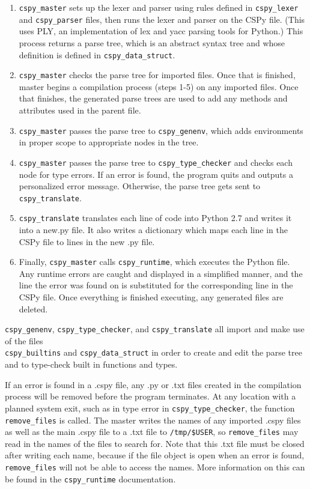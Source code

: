 \documentclass{article}
\begin{document}
\begin{enumerate}
\item \verb|cspy_master| sets up the lexer and parser using rules defined in \verb|cspy_lexer| and \verb|cspy_parser| files, then runs the lexer and parser on the CSPy file. (This uses PLY, an implementation of lex and yacc parsing tools for Python.) This process returns a parse tree, which is an abstract syntax tree and whose definition is defined in \verb|cspy_data_struct|.

\item \verb|cspy_master| checks the parse tree for imported files. Once that is finished, master begins a compilation process (steps 1-5) on any imported files. Once that finishes, the generated parse trees are used to add any methods and attributes used in the parent file.

\item \verb|cspy_master| passes the parse tree to \verb|cspy_genenv|, which adds environments in proper scope to appropriate nodes in the tree.

\item \verb|cspy_master| passes the parse tree to \verb|cspy_type_checker| and checks each node for type errors. If an error is found, the program quits and outputs a personalized error message. Otherwise, the parse tree gets sent to \verb|cspy_translate|.

\item \verb|cspy_translate| translates each line of code into Python 2.7 and writes it into a new.py file. It also writes a dictionary which maps each line in the CSPy file to lines in the new .py file.

\item Finally, \verb|cspy_master| calls \verb|cspy_runtime|, which executes the Python file. Any runtime errors are caught and displayed in a simplified manner, and the line the error was found on is substituted for the corresponding line in the CSPy file. Once everything is finished executing, any generated files are deleted.
\end{enumerate}

\verb|cspy_genenv|, \verb|cspy_type_checker|, and \verb|cspy_translate| all import and make use of the files\\ %
\verb|cspy_builtins| and \verb|cspy_data_struct| in order to create and edit the parse tree and to type-check built in functions and types.

If an error is found in a .cspy file, any .py or .txt files created in the compilation process will be removed before the program terminates. At any location with a planned system exit, such as in type error in \verb|cspy_type_checker|, the function \verb|remove_files| is called. The master writes the names of any imported .cspy files as well as the main .cspy file to a .txt file to \verb|/tmp/$USER|, so \verb|remove_files| may read in the names of the files to search for. Note that this .txt file must be closed after writing each name, because if the file object is open when an error is found, \verb|remove_files| will not be able to access the names. More information on this can be found in the \verb|cspy_runtime| documentation. 
\end{document}
